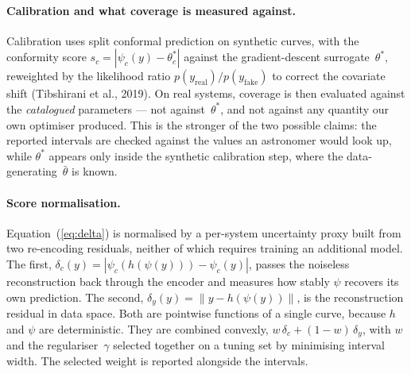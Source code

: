 \paragraph{Calibration and what coverage is measured against.}
Calibration uses split conformal prediction on synthetic curves, with the
conformity score $s_c = |\psi_c(y) - \theta^\ast_c|$ against the
gradient-descent surrogate~$\theta^\ast$, reweighted by the likelihood ratio
$p(y_{\mathrm{real}})/p(y_{\mathrm{fake}})$ to correct the covariate shift
(Tibshirani et al., 2019).  On real systems, coverage is then evaluated against
the \emph{catalogued} parameters --- not against~$\theta^\ast$, and not against
any quantity our own optimiser produced.  This is the stronger of the two
possible claims: the reported intervals are checked against the values an
astronomer would look up, while $\theta^\ast$ appears only inside the synthetic
calibration step, where the data-generating~$\bar\theta$ is known.

\paragraph{Score normalisation.}
Equation~(\ref{eq:delta}) is normalised by a per-system uncertainty proxy built
from two re-encoding residuals, neither of which requires training an
additional model.  The first, $\delta_c(y) = |\psi_c(h(\psi(y))) - \psi_c(y)|$,
passes the noiseless reconstruction back through the encoder and measures how
stably $\psi$ recovers its own prediction.  The second,
$\delta_y(y) = \|y - h(\psi(y))\|$, is the reconstruction residual in data
space.  Both are pointwise functions of a single curve, because $h$ and $\psi$
are deterministic.  They are combined convexly,
$w\,\delta_c + (1-w)\,\delta_y$, with $w$ and the regulariser~$\gamma$ selected
together on a tuning set by minimising interval width.
The selected weight is reported alongside the intervals.

